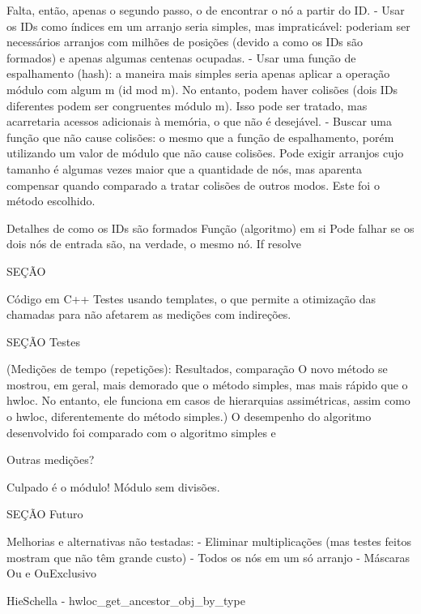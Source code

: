\documentclass{ufsc-thesis}
\begin{document}
Falta, então, apenas o segundo passo, o de encontrar o nó a partir do ID.
- Usar os IDs como índices em um arranjo seria simples, mas impraticável:
poderiam ser necessários arranjos com milhões de posições (devido a como os IDs são formados) e apenas algumas centenas ocupadas.
- Usar uma função de espalhamento (hash): a maneira mais simples seria apenas aplicar a operação módulo com algum m (id mod m).
No entanto, podem haver colisões (dois IDs diferentes podem ser congruentes módulo m).
Isso pode ser tratado, mas acarretaria acessos adicionais à memória, o que não é desejável.
- Buscar uma função que não cause colisões: o mesmo que a função de espalhamento, porém utilizando um valor de módulo que não cause colisões.
Pode exigir arranjos cujo tamanho é algumas vezes maior que a quantidade de nós, mas aparenta compensar quando comparado a tratar colisões de outros modos.
Este foi o método escolhido.



Detalhes de como os IDs são formados
Função (algoritmo) em si
Pode falhar se os dois nós de entrada são, na verdade, o mesmo nó. If resolve


SEÇÃO

Código em C++
Testes usando templates, o que permite a otimização das chamadas para não afetarem as medições com indireções.


SEÇÃO Testes

(Medições de tempo (repetições):
Resultados, comparação
O novo método se mostrou, em geral, mais demorado que o método simples, mas mais rápido que o hwloc.
No entanto, ele funciona em casos de hierarquias assimétricas, assim como o hwloc, diferentemente do método simples.)
O desempenho do algoritmo desenvolvido foi comparado com o algoritmo simples e

Outras medições?

Culpado é o módulo! Módulo sem divisões.


SEÇÃO Futuro

Melhorias e alternativas não testadas:
- Eliminar multiplicações (mas testes feitos mostram que não têm grande custo)
- Todos os nós em um só arranjo
- Máscaras Ou e OuExclusivo

HieSchella - hwloc\_get\_ancestor\_obj\_by\_type
\end{document}
